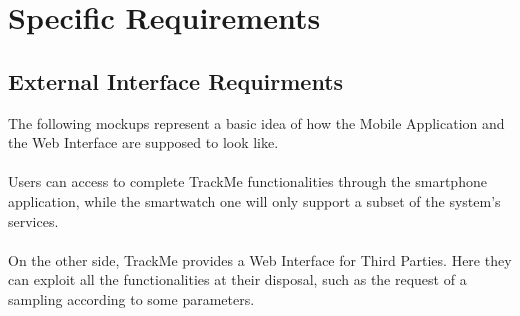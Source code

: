 \documentclass[12pt,a4paper]{article}
\begin{document}
	\newpage
	\section{Specific Requirements}
		\subsection{External Interface Requirments}
			The following mockups represent a basic idea of how the Mobile Application and the Web Interface are supposed to look like.
			\\ \\
			Users can access to complete TrackMe functionalities through the smartphone application, while the smartwatch one will only support a subset of the system's services.
			\\ \\
			On the other side, TrackMe provides a Web Interface for Third Parties. Here they can exploit all the functionalities at their disposal, such as the request of a sampling according to some parameters.
	
\end{document}
